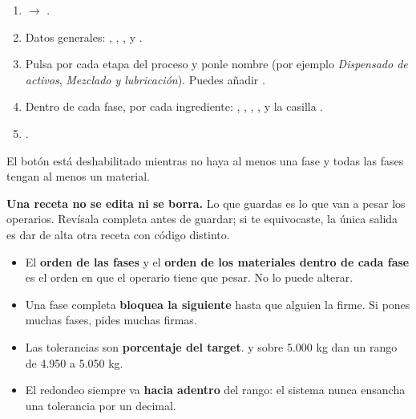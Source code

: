 
\newpage
{}


\begin{enumerate}
    \item {} $\rightarrow$ .
    \item Datos generales: , , ,
           y .
    \item Pulsa  por cada etapa del proceso y ponle nombre
          (por ejemplo \textit{Dispensado de activos}, \textit{Mezclado y lubricación}).
          Puedes añadir .
    \item Dentro de cada fase,  por cada ingrediente:
          , , , ,
           y la casilla .
    \item {}.
\end{enumerate}


\vspace{6pt}

El botón  está deshabilitado mientras no haya al menos una fase
y todas las fases tengan al menos un material.

\begin{cajaOjo}
\textbf{Una receta no se edita ni se borra.} Lo que guardas es lo que van a pesar los
operarios. Revísala completa antes de guardar; si te equivocaste, la única salida es
dar de alta otra receta con código distinto.
\end{cajaOjo}


\begin{itemize}
    \item El \textbf{orden de las fases} y el \textbf{orden de los materiales dentro de
          cada fase} es el orden en que el operario tiene que pesar. No lo puede alterar.
    \item Una fase completa \textbf{bloquea la siguiente} hasta que alguien la firme.
          Si pones muchas fases, pides muchas firmas.
    \item Las tolerancias son \textbf{porcentaje del target}.  y  sobre
          5.000 kg dan un rango de 4.950 a 5.050 kg.
    \item El redondeo siempre va \textbf{hacia adentro} del rango: el sistema nunca
          ensancha una tolerancia por un decimal.
\end{itemize}

